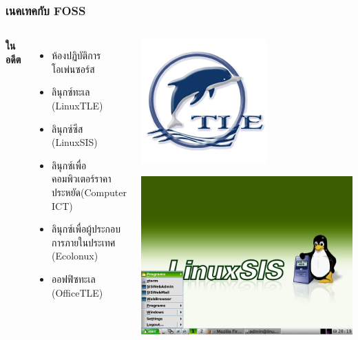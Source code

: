 \begin{frame}[t]
  \frametitle{เนคเทคกับ FOSS}

  \begin{columns}

    \textbf{ในอดีต}
    \begin{itemize}
      \item ห้องปฏิบัติการโอเพ่นซอร์ส
      \item ลินุกซ์ทะเล (LinuxTLE)
      \item ลินุกซ์ซีส (LinuxSIS)
      \item ลินุกซ์เพื่อคอมพิวเตอร์ราคาประหยัด(Computer ICT)
      \item ลินุกซ์เพื่อผู้ประกอบการภายในประเทศ (Ecolonux)
      \item ออฟฟิซทะเล (OfficeTLE)
    \end{itemize}

    \begin{center}
      \includegraphics[width=.4\linewidth]{images/linuxtle.png}

      \includegraphics[width=.5\linewidth]{images/linuxsis.jpg}
    \end{center}
  \end{columns}
\end{frame}